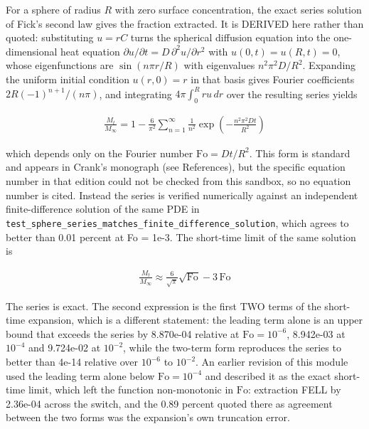 \documentclass[10pt,a4paper,twoside]{report}
\begin{document}
For a sphere of radius $R$ with zero surface concentration, the exact series solution of Fick's second law gives the fraction extracted. It is DERIVED here rather than quoted: substituting $u = rC$ turns the spherical diffusion equation into the one-dimensional heat equation $\partial u/\partial t = D\,\partial^2 u/\partial r^2$ with $u(0,t) = u(R,t) = 0$, whose eigenfunctions are $\sin(n\pi r/R)$ with eigenvalues $n^2\pi^2 D/R^2$. Expanding the uniform initial condition $u(r,0) = r$ in that basis gives Fourier coefficients $2R(-1)^{n+1}/(n\pi)$, and integrating $4\pi\int_0^R r u\,dr$ over the resulting series yields

\begin{equation*}
\begin{gathered}
\frac{M_t}{M_\infty} = 1 - \frac{6}{\pi^2} \sum_{n=1}^{\infty} \frac{1}{n^2} \exp\!\left(-\frac{n^2 \pi^2 D t}{R^2}\right)
\end{gathered}
\end{equation*}

which depends only on the Fourier number $\mathrm{Fo} = Dt/R^2$. This form is standard and appears in Crank's monograph (see References), but the specific equation number in that edition could not be checked from this sandbox, so no equation number is cited. Instead the series is verified numerically against an independent finite-difference solution of the same PDE in \texttt{test\_sphere\_series\_matches\_finite\_difference\_solution}, which agrees to better than 0.01 percent at Fo = 1e-3. The short-time limit of the same solution is

\begin{equation*}
\begin{gathered}
\frac{M_t}{M_\infty} \approx \frac{6}{\sqrt{\pi}} \sqrt{\mathrm{Fo}} - 3\,\mathrm{Fo}
\end{gathered}
\end{equation*}

The series is exact. The second expression is the first TWO terms of the short-time expansion, which is a different statement: the leading term alone is an upper bound that exceeds the series by 8.870e-04 relative at $\mathrm{Fo} = 10^{-6}$, 8.942e-03 at $10^{-4}$ and 9.724e-02 at $10^{-2}$, while the two-term form reproduces the series to better than 4e-14 relative over $10^{-6}$ to $10^{-2}$. An earlier revision of this module used the leading term alone below $\mathrm{Fo} = 10^{-4}$ and described it as the exact short-time limit, which left the function non-monotonic in $\mathrm{Fo}$: extraction FELL by 2.36e-04 across the switch, and the 0.89 percent quoted there as agreement between the two forms was the expansion's own truncation error.
\end{document}
